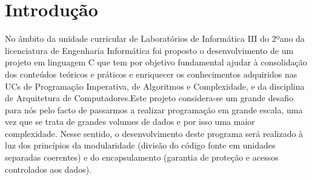 \chapter{Introdução}

No âmbito da unidade curricular de Laboratórios de Informática III do 2ºano da licenciatura de Engenharia Informática foi proposto o desenvolvimento de um projeto em linguagem C que tem por objetivo fundamental ajudar à consolidação dos conteúdos teóricos e práticos e enriquecer os conhecimentos adquiridos nas UCs de Programação Imperativa, de Algoritmos e Complexidade, e da disciplina de Arquitetura de Computadores.Este projeto considera-se um grande desafio para nós pelo facto de passarmos a realizar programação em grande escala, uma vez que se trata de grandes volumes de dados e por isso uma maior complexidade. Nesse sentido, o desenvolvimento deste programa será realizado à luz dos princípios da modularidade (divisão do código fonte em unidades separadas coerentes) e do encapsulamento (garantia de proteção e acessos controlados aos dados). 

